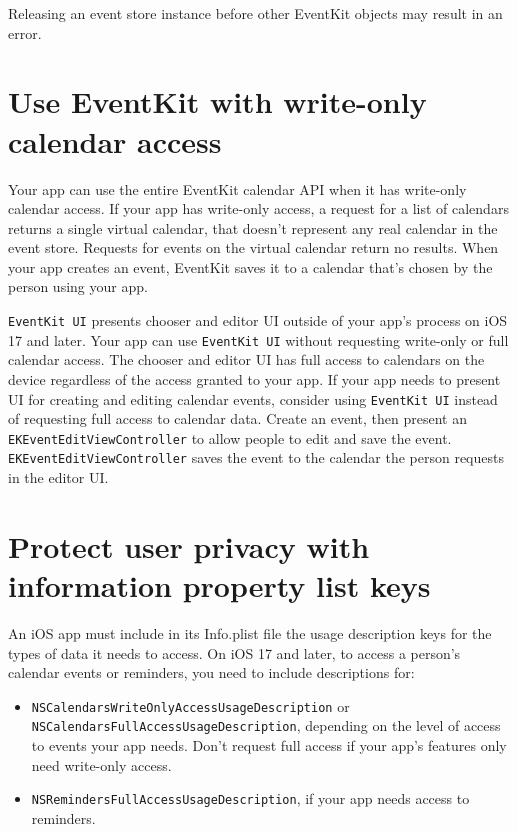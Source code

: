 \documentclass{article}
\begin{document}
Releasing an event store instance before other EventKit objects may result in an error.

\section*{Use EventKit with write-only calendar access}
Your app can use the entire EventKit calendar API when it has write-only calendar access. If your app has write-only access, a request for a list of calendars returns a single virtual calendar, that doesn't represent any real calendar in the event store. Requests for events on the virtual calendar return no results. When your app creates an event, EventKit saves it to a calendar that's chosen by the person using your app.

\texttt{EventKit UI} presents chooser and editor UI outside of your app's process on iOS 17 and later. Your app can use \texttt{EventKit UI} without requesting write-only or full calendar access. The chooser and editor UI has full access to calendars on the device regardless of the access granted to your app. If your app needs to present UI for creating and editing calendar events, consider using \texttt{EventKit UI} instead of requesting full access to calendar data. Create an event, then present an \texttt{EKEventEditViewController} to allow people to edit and save the event. \texttt{EKEventEditViewController} saves the event to the calendar the person requests in the editor UI.

\section*{Protect user privacy with information property list keys}
An iOS app must include in its Info.plist file the usage description keys for the types of data it needs to access. On iOS 17 and later, to access a person's calendar events or reminders, you need to include descriptions for:

\begin{itemize}
    \item \texttt{NSCalendarsWriteOnlyAccessUsageDescription} or \texttt{NSCalendarsFullAccessUsageDescription}, depending on the level of access to events your app needs. Don't request full access if your app's features only need write-only access.
    \item \texttt{NSRemindersFullAccessUsageDescription}, if your app needs access to reminders.
\end{itemize}
\end{document}
